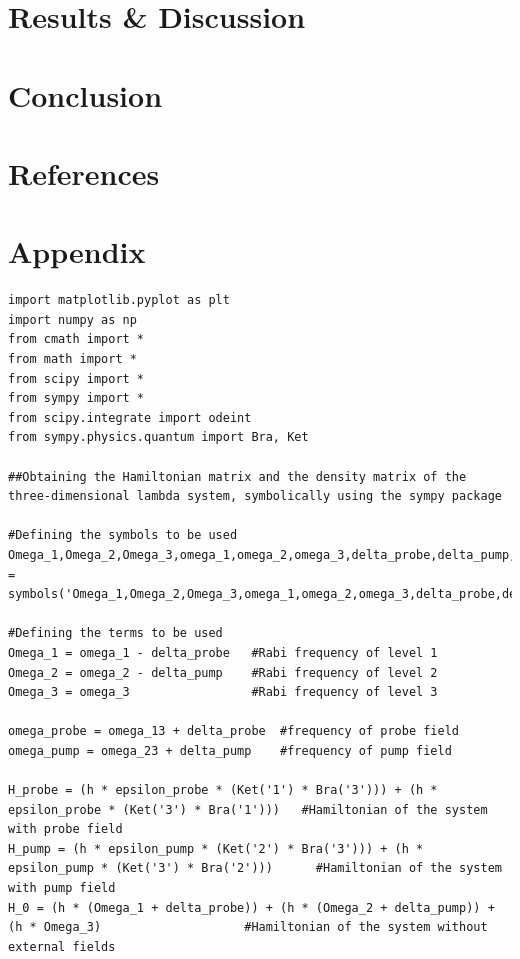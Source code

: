 \documentclass[12pt, a4paper]{article}
\begin{document}
\section{Results \& Discussion}

\section{Conclusion}

\section{References}

\section{Appendix}
\begin{lstlisting}[language=iPython]
import matplotlib.pyplot as plt
import numpy as np
from cmath import *
from math import *
from scipy import *
from sympy import *
from scipy.integrate import odeint
from sympy.physics.quantum import Bra, Ket

##Obtaining the Hamiltonian matrix and the density matrix of the three-dimensional lambda system, symbolically using the sympy package

#Defining the symbols to be used
Omega_1,Omega_2,Omega_3,omega_1,omega_2,omega_3,delta_probe,delta_pump,omega_probe,omega_pump,omega_13,omega_23,H_probe,H_pump,H_0,h,epsilon_probe,epsilon_pump,H,gamma_13,gamma_23,gamma = symbols('Omega_1,Omega_2,Omega_3,omega_1,omega_2,omega_3,delta_probe,delta_pump,omega_probe,omega_pump,omega_13,omega_23,H_probe,H_pump,H_0,h,epsilon_probe,epsilon_pump,H,gamma_13,gamma_23,gamma')

#Defining the terms to be used
Omega_1 = omega_1 - delta_probe   #Rabi frequency of level 1
Omega_2 = omega_2 - delta_pump    #Rabi frequency of level 2
Omega_3 = omega_3                 #Rabi frequency of level 3

omega_probe = omega_13 + delta_probe  #frequency of probe field
omega_pump = omega_23 + delta_pump    #frequency of pump field

H_probe = (h * epsilon_probe * (Ket('1') * Bra('3'))) + (h * epsilon_probe * (Ket('3') * Bra('1')))   #Hamiltonian of the system with probe field
H_pump = (h * epsilon_pump * (Ket('2') * Bra('3'))) + (h * epsilon_pump * (Ket('3') * Bra('2')))      #Hamiltonian of the system with pump field
H_0 = (h * (Omega_1 + delta_probe)) + (h * (Omega_2 + delta_pump)) + (h * Omega_3)                    #Hamiltonian of the system without external fields


\end{lstlisting}
\end{document}
